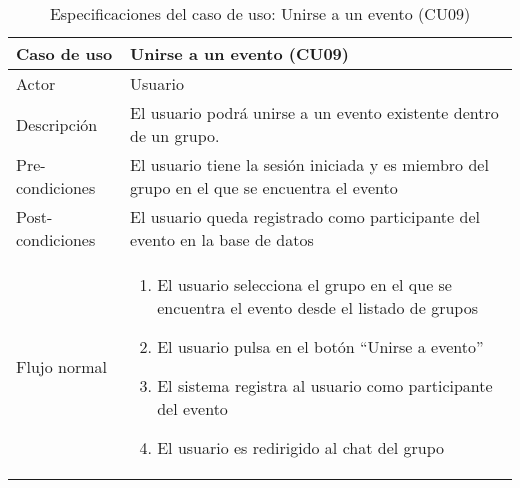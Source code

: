 \begin{table}[h]
    \centering
    \begin{tabular}{|m{3cm}|m{11cm}|}
        \hline
        \rowcolor{blue!20} Caso de uso & Unirse a un evento (CU09) \\
        \hline
        Actor & Usuario \\
        \hline
        \rowcolor{blue!20} Descripción & El usuario podrá unirse a un evento existente dentro de un grupo. \\
        \hline
        Pre-condiciones & El usuario tiene la sesión iniciada y es miembro del grupo en el que se encuentra el evento \\
        \hline
        \rowcolor{blue!20} Post-condiciones & El usuario queda registrado como participante del evento en la base de datos \\
        \hline
        Flujo normal & 
            \begin{enumerate}[noitemsep]
            \item El usuario selecciona el grupo en el que se encuentra el evento desde el listado de grupos
            \item El usuario pulsa en el botón \enquote{Unirse a evento}
            \item El sistema registra al usuario como participante del evento
            \item El usuario es redirigido al chat del grupo
            \end{enumerate}
         \\
         \hline
    \end{tabular}
    \caption{Especificaciones del caso de uso: Unirse a un evento (CU09)}
\end{table}
